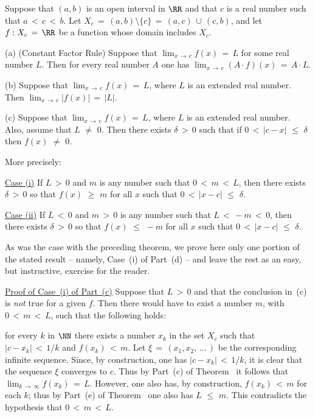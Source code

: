 {        Suppose that $(a,b)$ is an open interval in ${\RR}$ and that $c$ is a real number such that $a\,<\,c\,<\,b$.
    Let $X_{c} \,=\, (a,b){\setminus}\{c\} \,=\, (a,c)\,{\cup}\,(c,b)$, and let $f:X_{c} \,=\, {\RR}$ be a function whose domain includes $X_{c}$.

\V

        (a) (Constant Factor Rule) Suppose that ${\displaystyle \lim_{x \,{\rightarrow}\, c} f(x) \,=\, L}$ for some real number $L$.
    Then for every real number $A$ one has ${\displaystyle \lim_{x \,{\rightarrow}\, c} (A{\cdot}f)(x) \,=\, A{\cdot}L}$.

\V

        (b) Suppose that ${\displaystyle \lim_{x \,{\rightarrow}\, c}} f(x) \,=\, L$, where $L$ is an extended real number.
    Then ${\displaystyle \lim_{x \,{\rightarrow}\, c}} |f(x)| \,=\, |L|$.

\V

        (c) Suppose that ${\displaystyle \lim_{x \,{\rightarrow}\, c} f(x) \,=\, L}$,
    where $L$ is an extended real number. Also, assume that $L \,\,{\neq}\,\, 0$.
    Then there exists ${\delta}\,>\,0$ such that if $0\,<\,|c-x|\,\,{\leq}\,\,{\delta}$ then $f(x) \,\,{\neq}\,\, 0$.

        More precisely:

        \underline{Case (i)} If $L\,>\,0$ and $m$ is any number such that $0\,<\,m\,<\,L$, then there exists ${\delta}\,>\,0$ so that $f(x)\,\,{\geq}\,\,m$ for all $x$ such that $0\,<\,|x-c|\,\,{\leq}\,\,{\delta}$.

        \underline{Case (ii)} If $L\,<\,0$ and $m\,>\,0$ is any number such that $L\,<\,-m\,<\,0$, then there exists ${\delta}\,>\,0$ so that $f(x)\,\,{\leq}\,\,-m$ for all $x$ such that $0\,<\,|x-c|\,\,{\leq}\,\,{\delta}$.

\V


        As was the case with the preceding theorem, we prove here only one portion of the stated result -- namely, Case~(i) of Part~(d) -- and leave the rest as an easy, but instructive, exercise for the reader.

\V

        \underline{Proof of Case~(i) of Part~(c)} Suppose that $L\,>\,0$ and that the conclusion in~(c) is {\em not} true for a given $f$.
    Then there would have to exist a number $m$, with $0\,<\,m\,<\,L$, such that the following holds:

        for every $k$ in ${\NN}$ there exists a number $x_{k}$ in the set $X_{c}$ such that $|c-x_{k}|\,<\,1/k$ and $f(x_{k})\,<\,m$.
    Let ${\xi} \,=\, (x_{1},x_{2},\,{\ldots}\,)$ be the corresponding infinite sequence.
    Since, by construction, one has $|c-x_{k}|\,<\,1/k$, it is clear that the sequence ${\xi}$ converges to $c$.
    Thus by Part~(c) of Theorem~ it follows that $\lim_{k \,{\rightarrow}\, {\infty}} f(x_{k}) \,=\, L$.
    However, one also has, by construction, $f(x_{k})\,<\,m$ for each $k$; thus by Part~(e) of Theorem~ one also has $L\,\,{\leq}\,\,m$.
    This contradicts the hypothesis that $0\,<\,m\,<\,L$.

}
